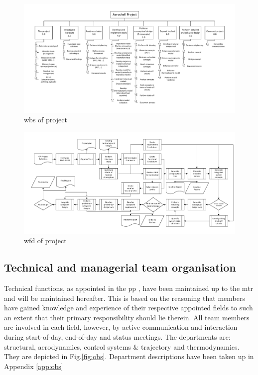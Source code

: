 \begin{figure}
    \includegraphics[scale=0.85]{Figure/WBS_MTR.pdf}
    \caption{\acrfull{wbs} of project}
    \label{fig:wbs}
\end{figure}
\begin{figure}
    \includegraphics[scale=0.85]{Figure/WFD_MTR.pdf}
    \caption{\acrfull{wfd} of project}
    \label{fig:wfd}
\end{figure}

\subsection{Technical and managerial team organisation}
\label{sec:org}
Technical functions, as appointed in the \acrfull{pp} \cite{Balasooriyan2015}, have been maintained up to the \gls{mtr} and will be maintained hereafter. This is based on the reasoning that members have gained knowledge and experience of their respective appointed fields to such an extent that their primary responsibility should lie therein. All team members are involved in each field, however, by active communication and interaction during start-of-day, end-of-day and status meetings. The departments are: structural, aerodynamics, control systems $\&$ trajectory and thermodynamics. They are depicted in Fig.\ref{fig:obs}. Department descriptions have been taken up in Appendix \ref{app:obs}

